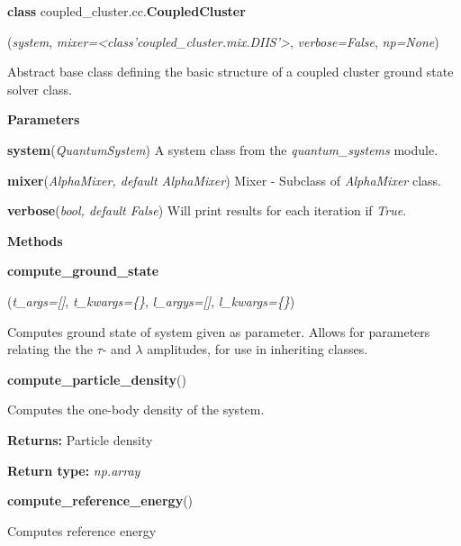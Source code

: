 \begin{tcolorbox}
    {\selectfont
    \textbf{class} coupled\_cluster.cc.\textbf{CoupledCluster}

    \hspace{1em}(\emph{system}, \emph{mixer=<class'coupled\_cluster.mix.DIIS'>}, 
        \emph{verbose=False}, \emph{np=None})

    \vspace{1em}
    Abstract base class defining the basic structure of a coupled cluster ground state 
    solver class.
    
    \vspace{1em}
    \textbf{Parameters}

    \hspace{2em}\textbf{system}(\emph{QuantumSystem}) A system class from the 
        \emph{quantum\_systems} module.

    \hspace{2em}\textbf{mixer}(\emph{AlphaMixer, default AlphaMixer}) Mixer - 
        Subclass of \emph{AlphaMixer} class.

    \hspace{2em}\textbf{verbose}(\emph{bool, default False}) Will print results 
        for each iteration if \emph{True}.

    \vspace{1em}
    \textbf{Methods}

    \hspace{2em} \textbf{compute\_ground\_state}
        \begin{adjustwidth}{4em}{}
        (\emph{t\_args=[]}, \emph{t\_kwargs=\{\}}, \emph{l\_argys=[]}, \emph{l\_kwargs=\{\}})

        Computes ground state of system given as parameter. Allows for parameters relating 
        the the $\tau$- and $\lambda$ amplitudes, for use in inheriting classes.
        \end{adjustwidth}
    
    \hspace{2em} \textbf{compute\_particle\_density}()
        \begin{adjustwidth}{4em}{}
        Computes the one-body density of the system.
   
        \textbf{Returns:} Particle density 
  
        \textbf{Return type:} \emph{np.array}
        \end{adjustwidth}
    
    \hspace{2em} \textbf{compute\_reference\_energy}()
        \begin{adjustwidth}{4em}{}
        Computes reference energy


\end{adjustwidth}}
\end{tcolorbox}
